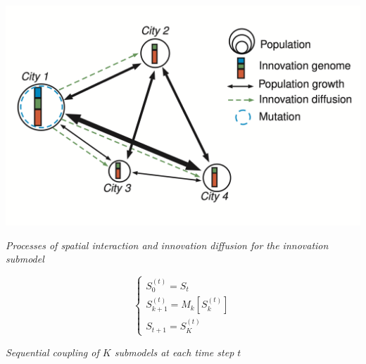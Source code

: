 \documentclass[a0paper]{tikzposter}
\begin{document}
{\begin{minipage}{0.2\textwidth}
            \includegraphics[width=\linewidth]{figures/model_4.png}

            \medskip

            \textit{Processes of spatial interaction and innovation diffusion for the innovation submodel}
   
		\end{minipage}\hfill%
            \begin{minipage}{0.12\textwidth}


\[
\begin{cases}
    S_0^{(t)} = S_t \\
    S_{k+1}^{(t)} = M_{k}\left[S_{k}^{(t)} \right] \\
    S_{t+1} = S_{K}^{(t)}
\end{cases}
\]

            \bigskip
            \bigskip

            \textit{Sequential coupling of $K$ submodels at each time step $t$}

            \end{minipage}
		
	}
\end{document}
